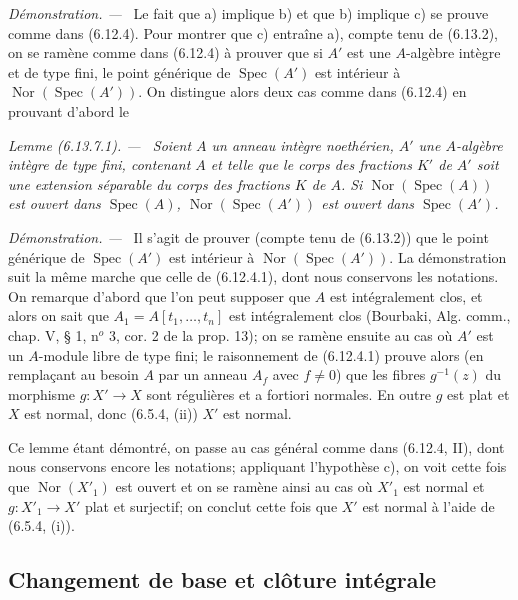 \documentclass[10pt,oneside]{book}
\newenvironment{lemma}[1][]{%
  \par\medskip\noindent\itshape Lemme (#1). ---\ }{\par}
\newenvironment{proof}{%
  \par\medskip\noindent\textit{Démonstration. ---\ }}{\par}
\begin{document}
\begin{proof}
Le fait que a) implique b) et que b) implique c) se prouve comme dans
(6.12.4). Pour montrer que c) entraîne a), compte tenu de (6.13.2), on se
ramène comme dans (6.12.4) à prouver que si $A'$ est une $A$-algèbre intègre
et de type fini, le point générique de $\operatorname{Spec}(A')$ est
intérieur à $\operatorname{Nor}(\operatorname{Spec}(A'))$. On distingue
alors deux cas comme dans (6.12.4) en prouvant d'abord le

\begin{lemma}[6.13.7.1]
\label{IV.2.s6.13.7.1-fr}
Soient $A$ un anneau intègre noethérien, $A'$ une $A$-algèbre intègre de
type fini, contenant $A$ et telle que le corps des fractions $K'$ de $A'$
soit une extension séparable du corps des fractions $K$ de $A$. Si
$\operatorname{Nor}(\operatorname{Spec}(A))$ est ouvert dans
$\operatorname{Spec}(A)$, $\operatorname{Nor}(\operatorname{Spec}(A'))$ est
ouvert dans $\operatorname{Spec}(A')$.
\end{lemma}

\begin{proof}
Il s'agit de prouver (compte tenu de (6.13.2)) que le point générique de
$\operatorname{Spec}(A')$ est intérieur à
$\operatorname{Nor}(\operatorname{Spec}(A'))$. La démonstration suit la
même marche que celle de (6.12.4.1), dont nous conservons les notations. On
remarque d'abord que l'on peut supposer que $A$ est intégralement clos, et
alors on sait que $A_1=A[t_1,\ldots,t_n]$ est intégralement clos (Bourbaki,
Alg. comm., chap. V, § 1, n$^o$ 3, cor. 2 de la prop. 13); on se ramène
ensuite au cas où $A'$ est un $A$-module libre de type fini; le raisonnement
de (6.12.4.1) prouve alors (en remplaçant au besoin $A$ par un anneau $A_f$
avec $f\neq0$) que les fibres $g^{-1}(z)$ du morphisme $g:X'\to X$ sont
régulières et a fortiori normales. En outre $g$ est plat et $X$ est normal,
donc (6.5.4, (ii)) $X'$ est normal.
\end{proof}

Ce lemme étant démontré, on passe au cas général comme dans (6.12.4, II),
dont nous conservons encore les notations; appliquant l'hypothèse c), on
voit cette fois que $\operatorname{Nor}(X'_1)$ est ouvert et on se ramène
ainsi au cas où $X'_1$ est normal et $g:X'_1\to X'$ plat et surjectif; on
conclut cette fois que $X'$ est normal à l'aide de (6.5.4, (i)).
\end{proof}

\subsection{Changement de base et clôture intégrale}
\label{IV.2.s6.14-fr}
\end{document}
